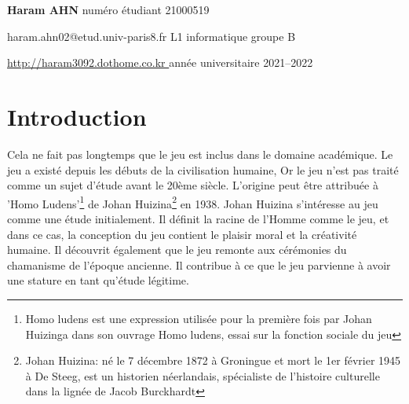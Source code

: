 \documentclass{article}
\begin{document}
\begin{titlepage}
\begin{center}
  \end{center}

  \vfill

  \large

  \textbf{Haram \textsc{AHN}}
  \hfill
  numéro étudiant 21000519


  haram.ahn02@etud.univ-paris8.fr
  \hfill
  L1 informatique groupe B

  \url{http://haram3092.dothome.co.kr }
  \hfill
  année universitaire 2021--2022


\end{titlepage}
\maketitle
\clearpage
\tableofcontents
\newpage
\section{Introduction}

\vspace{1cm}
Cela ne fait pas longtemps que le jeu est inclus dans le domaine académique. Le jeu a existé depuis les débuts de la civilisation humaine, Or le jeu n’est pas traité comme un sujet d’étude avant le 20ème siècle. L'origine peut être attribuée à 'Homo Ludens'\footnote{Homo ludens est une expression utilisée pour la première fois par Johan Huizinga dans son ouvrage Homo ludens, essai sur la fonction sociale du jeu} de Johan Huizina\footnote{Johan Huizina: né le 7 décembre 1872 à Groningue et mort le 1er février 1945 à De Steeg, est un historien néerlandais, spécialiste de l’histoire culturelle dans la lignée de Jacob Burckhardt} en 1938. Johan Huizina s’intéresse au jeu comme une étude initialement. Il définit la racine de l’Homme comme le jeu, et dans ce cas, la conception du jeu contient le plaisir moral et la créativité humaine. Il découvrit également que le jeu remonte aux cérémonies du chamanisme de l’époque ancienne. Il contribue à ce que le jeu parvienne à avoir une stature en tant qu’étude légitime.
\end{document}

